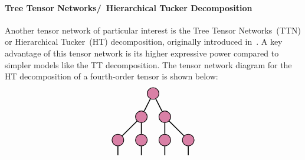 \paragraph{Tree Tensor Networks/~Hierarchical Tucker Decomposition}
Another tensor network of particular interest is the Tree Tensor Networks~(TTN) or Hierarchical Tucker~(HT) decomposition, originally introduced in~\citep{hackbusch2009new, grasedyck2010hierarchical}. A key advantage of this tensor network is its higher expressive power compared to simpler models like the TT decomposition. The tensor network diagram for the HT decomposition of a fourth-order tensor is shown below:
$$
\begin{tikzpicture}[baseline=\baseline]
    \tikzset{tensor/.style = {minimum size = 0.5cm,shape = circle,thick,draw=black,inner sep = 0pt}, edge/.style   = {thick,line width=.4mm},every loop/.style={}}
    \def\y{0}
    \def\x{0}
    \node[tensor,fill=blue!30!red!50!white] (A) at (\x+0.5,\y+1) {};
    \node[tensor,fill=blue!30!red!50!white] (B) at (\x,\y) {};
  \node[tensor,fill=blue!30!red!50!white] (C) at (\x+1,\y){};
   \node[tensor,fill=blue!30!red!50!white] (D) at (\x-1,\y-1){};
   \node[tensor,fill=blue!30!red!50!white] (E) at (\x,\y-1){};
   \node[tensor,fill=blue!30!red!50!white] (F) at (\x+1,\y-1){};
   \node[tensor,fill=blue!30!red!50!white] (G) at (\x+2,\y-1){};
   \draw[edge](A) -- (B);
   \draw[edge](A) -- (C);
   \draw[edge](B) -- (D);
   \draw[edge](B) -- (E);
    \draw[edge](C) -- (F);
   \draw[edge](C) -- (G);
    \draw[edge](D) -- (\x-1,\y-1.65);
   \draw[edge](E) -- (\x,\y-1.65);
    \draw[edge](F) -- (\x+1,\y-1.65);
   \draw[edge](G) -- (\x+2,\y-1.65);
\end{tikzpicture}
$$







